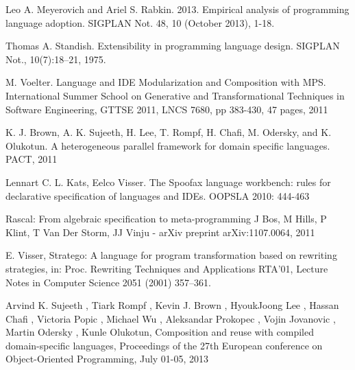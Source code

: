 \documentclass[conference]{IEEEtran}
\begin{document}
%
%
%
\begin{thebibliography}{1}

Leo A. Meyerovich and Ariel S. Rabkin. 2013. Empirical analysis of programming language adoption. SIGPLAN Not. 48, 10 (October 2013), 1-18.

Thomas A. Standish. Extensibility in programming language design. SIGPLAN Not., 10(7):18–21, 1975. 

M. Voelter. Language and IDE Modularization and Composition with MPS. International Summer School on Generative and Transformational Techniques in Software Engineering, GTTSE 2011, LNCS 7680, pp 383-430, 47 pages, 2011

K. J. Brown, A. K. Sujeeth, H. Lee, T. Rompf, H. Chafi, M. Odersky, and K. Olukotun. A heterogeneous parallel framework for domain specific languages. PACT, 2011

Lennart C. L. Kats, Eelco Visser. The Spoofax language workbench: rules for declarative specification of languages and IDEs. OOPSLA 2010: 444-463

Rascal: From algebraic specification to meta-programming
J Bos, M Hills, P Klint, T Van Der Storm, JJ Vinju - arXiv preprint arXiv:1107.0064, 2011

E. Visser, Stratego: A language for program transformation based on rewriting strategies, in: Proc. Rewriting Techniques and Applications
RTA’01, Lecture Notes in Computer Science 2051 (2001) 357–361.

Arvind K. Sujeeth , Tiark Rompf , Kevin J. Brown , HyoukJoong Lee , Hassan Chafi , Victoria Popic , Michael Wu , Aleksandar Prokopec , Vojin Jovanovic , Martin Odersky , Kunle Olukotun, Composition and reuse with compiled domain-specific languages, Proceedings of the 27th European conference on Object-Oriented Programming, July 01-05, 2013


\end{thebibliography}
\end{document}
